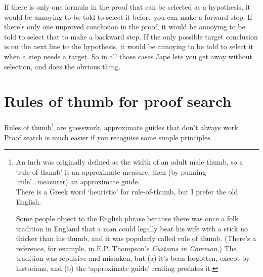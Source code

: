 \documentclass[11pt]{book}
\begin{document}
If there is only one formula in the proof that can be selected 
as a hypothesis, it would be annoying to be told to select it 
before you can make a forward step. If there's only one unproved 
conclusion in the proof, it would be annoying to be told to select 
that to make a backward step. If the only possible target conclusion 
is on the next line to the hypothesis, it would be annoying to 
be told to select it when a step needs a target. So in all those 
cases Jape lets you get away without selection, and does the 
obvious thing.


\chapter{Rules of thumb for proof search}

Rules of thumb\footnote{An inch was originally defined as the width 
of an adult male thumb, so a `rule of thumb' is an approximate 
measure, then (by punning `rule'=measurer) an approximate guide.\\
There is a Greek word `heuristic' for rule-of-thumb, but I 
prefer the old English. 

Some people object to the English phrase 
because there was once a folk tradition in England that a man 
could legally beat his wife with a stick no thicker than his 
thumb, and it was popularly called rule of thumb. (There's 
a reference, for example, in E.P. Thompson's \textit{Customs in Common}.) The tradition 
was repulsive and mistaken, but (a) it's been forgotten, 
except by historians, and (b) the `approximate guide' reading 
predates it.} are guesswork, approximate guides that don't always 
work. Proof search is much easier if you recognise some simple principles.
\end{document}
